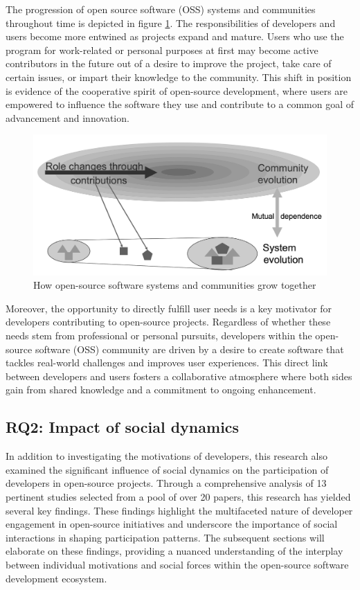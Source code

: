 The progression of open source software (OSS) systems and communities throughout time is depicted in figure \ref{fig:roleMotivation}.  The responsibilities of developers and users become more entwined as projects expand and mature.  Users who use the program for work-related or personal purposes at first may become active contributors in the future out of a desire to improve the project, take care of certain issues, or impart their knowledge to the community.  This shift in position is evidence of the cooperative spirit of open-source development, where users are empowered to influence the software they use and contribute to a common goal of advancement and innovation.


\begin{figure}[ht]
    \centering
    \includegraphics[width=0.65\linewidth]{figs/roleMotivation.png}
    \caption{How open-source software systems and communities grow together \cite{06ye2003toward} }
    \label{fig:roleMotivation}
\end{figure}



Moreover, the opportunity to directly fulfill user needs is a key motivator for developers contributing to open-source projects. Regardless of whether these needs stem from professional or personal pursuits, developers within the open-source software (OSS) community are driven by a desire to create software that tackles real-world challenges and improves user experiences. This direct link between developers and users fosters a collaborative atmosphere where both sides gain from shared knowledge and a commitment to ongoing enhancement.

\subsection{RQ2: Impact of social dynamics}

In addition to investigating the motivations of developers, this research also examined the significant influence of social dynamics on the participation of developers in open-source projects. Through a comprehensive analysis of 13 pertinent studies selected from a pool of over 20 papers, this research has yielded several key findings. These findings highlight the multifaceted nature of developer engagement in open-source initiatives and underscore the importance of social interactions in shaping participation patterns. The subsequent sections will elaborate on these findings, providing a nuanced understanding of the interplay between individual motivations and social forces within the open-source software development ecosystem.

